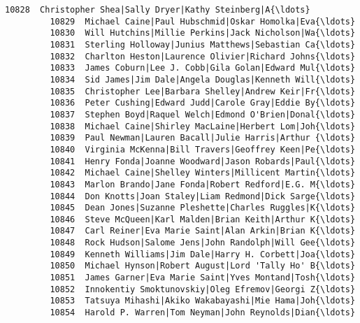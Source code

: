 \documentclass[11pt]{article}
\begin{document}
\begin{Verbatim}[commandchars=\\\{\}]
         10828  Christopher Shea|Sally Dryer|Kathy Steinberg|A{\ldots}   
         10829  Michael Caine|Paul Hubschmid|Oskar Homolka|Eva{\ldots}   
         10830  Will Hutchins|Millie Perkins|Jack Nicholson|Wa{\ldots}   
         10831  Sterling Holloway|Junius Matthews|Sebastian Ca{\ldots}   
         10832  Charlton Heston|Laurence Olivier|Richard Johns{\ldots}   
         10833  James Coburn|Lee J. Cobb|Gila Golan|Edward Mul{\ldots}   
         10834  Sid James|Jim Dale|Angela Douglas|Kenneth Will{\ldots}   
         10835  Christopher Lee|Barbara Shelley|Andrew Keir|Fr{\ldots}   
         10836  Peter Cushing|Edward Judd|Carole Gray|Eddie By{\ldots}   
         10837  Stephen Boyd|Raquel Welch|Edmond O'Brien|Donal{\ldots}   
         10838  Michael Caine|Shirley MacLaine|Herbert Lom|Joh{\ldots}   
         10839  Paul Newman|Lauren Bacall|Julie Harris|Arthur {\ldots}   
         10840  Virginia McKenna|Bill Travers|Geoffrey Keen|Pe{\ldots}   
         10841  Henry Fonda|Joanne Woodward|Jason Robards|Paul{\ldots}   
         10842  Michael Caine|Shelley Winters|Millicent Martin{\ldots}   
         10843  Marlon Brando|Jane Fonda|Robert Redford|E.G. M{\ldots}   
         10844  Don Knotts|Joan Staley|Liam Redmond|Dick Sarge{\ldots}   
         10845  Dean Jones|Suzanne Pleshette|Charles Ruggles|K{\ldots}   
         10846  Steve McQueen|Karl Malden|Brian Keith|Arthur K{\ldots}   
         10847  Carl Reiner|Eva Marie Saint|Alan Arkin|Brian K{\ldots}   
         10848  Rock Hudson|Salome Jens|John Randolph|Will Gee{\ldots}   
         10849  Kenneth Williams|Jim Dale|Harry H. Corbett|Joa{\ldots}   
         10850  Michael Hynson|Robert August|Lord 'Tally Ho' B{\ldots}   
         10851  James Garner|Eva Marie Saint|Yves Montand|Tosh{\ldots}   
         10852  Innokentiy Smoktunovskiy|Oleg Efremov|Georgi Z{\ldots}   
         10853  Tatsuya Mihashi|Akiko Wakabayashi|Mie Hama|Joh{\ldots}   
         10854  Harold P. Warren|Tom Neyman|John Reynolds|Dian{\ldots}   
         

\end{Verbatim}
\end{document}
